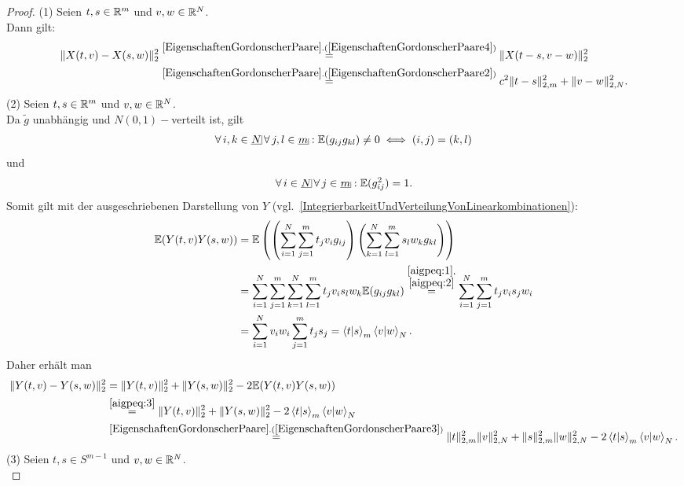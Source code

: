 \begin{proof}
(1) Seien $t, s \in \mathbb{R}^m$ und $v, w \in \mathbb{R}^N$.\\
Dann gilt:
\begin{align*}\norm{X(t, v) - X(s, w)}_2^2
&\overset{\refclaim{EigenschaftenGordonscherPaare}
                  {EigenschaftenGordonscherPaare4}}=
\norm{X(t-s, v-w)}_2^2 \\
&\overset{\refclaim{EigenschaftenGordonscherPaare}
                  {EigenschaftenGordonscherPaare2}}=
         c^2\norm{t - s}_{2,m}^2 + \norm{v-w}_{2, N}^2\text.
\end{align*}
(2) Seien $t, s \in \mathbb{R}^m$ und $v, w \in \mathbb{R}^N$.\\
Da $\widetilde g$ unabhängig und $N(0,1)-$verteilt ist, gilt
\begin{align}
\forall\, i, k \in \haken N\, \forall\, j, l \in \haken m:
\E(g_{ij}g_{kl}) \neq 0 \iff (i,j)=(k,l) \label{aigpeq:1}
\end{align}
und
\begin{align}
\forall\, i \in \haken N\, \forall\, j \in \haken m:
\E(g_{ij}^2) = 1 \text.\label{aigpeq:2}
\end{align}
Somit gilt mit der ausgeschriebenen Darstellung von $Y$ (vgl.~\ref{IntegrierbarkeitUndVerteilungVonLinearkombinationen}):
\begin{align}
\mathbb{E}(Y(t,v)Y(s,w)) & = 
\mathbb{E}\left(\left(\sum_{i=1}^N\sum_{j=1}^m t_jv_ig_{ij} \right)
\left(\sum_{k=1}^N\sum_{l=1}^m s_lw_kg_{kl} \right) \right)\notag\\
&= \sum_{i=1}^N\sum_{j=1}^m\sum_{k=1}^N\sum_{l=1}^mt_jv_is_lw_k
\mathbb{E}(g_{ij}g_{kl})
\overset{\substack{\eqref{aigpeq:1},\\\eqref{aigpeq:2}}}=
\sum_{i=1}^N\sum_{j=1}^mt_jv_is_jw_i\notag\\
&= \sum_{i=1}^N v_iw_i\sum_{j=1}^mt_js_j = \left\langle t |s\right\rangle _m \left\langle v |w\right\rangle_N\text.
\label{aigpeq:3}
\end{align}
Daher erhält man
\begin{align*}
\norm{Y(t, v) - Y(s, w)}_2^2 & = \norm{Y(t,v)}^2_2 + \norm{Y(s, w)}_2^2 -
2\E(Y(t,v)Y(s,w))\\
&\overset{\eqref{aigpeq:3}}= \norm{Y(t,v)}^2_2 + \norm{Y(s, w)}_2^2 -
2\sprod t s _m \sprod v w _N\\
&\overset{\refclaim{EigenschaftenGordonscherPaare}
{EigenschaftenGordonscherPaare3}}=
\norm t _{2,m}^2\norm v_{2, N}^2 + \norm s _{2, m}^2 \norm w_{2, N}^2
- 2 \sprod t s _m \sprod v w _N\text.
\end{align*}
(3) Seien $t, s \in S^{m-1}$ und $v, w \in \mathbb{R}^N$.\\

\end{proof}
